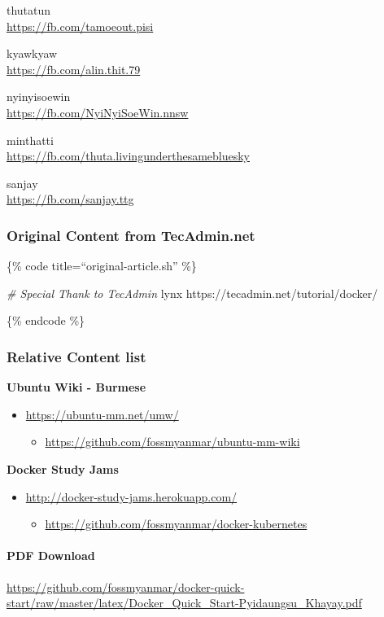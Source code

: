 \documentclass[]{article}
\newenvironment{Shaded}{}{}
\newcommand{\CommentTok}[1]{\textcolor[rgb]{0.38,0.63,0.69}{\textit{#1}}}
\newcommand{\FunctionTok}[1]{\textcolor[rgb]{0.02,0.16,0.49}{#1}}
\newcommand{\NormalTok}[1]{#1}
\providecommand{\tightlist}{%
  \setlength{\itemsep}{0pt}\setlength{\parskip}{0pt}}
\let\oldparagraph\paragraph
\renewcommand{\paragraph}[1]{\oldparagraph{#1}\mbox{}}
\begin{document}
thutatun\\
\url{https://fb.com/tamoeout.pisi}

kyawkyaw\\
\url{https://fb.com/alin.thit.79}

nyinyisoewin\\
\url{https://fb.com/NyiNyiSoeWin.nnsw}

minthatti\\
\url{https://fb.com/thuta.livingunderthesamebluesky}

sanjay\\
\url{https://fb.com/sanjay.ttg}

\hypertarget{original-content-from-tecadmin.net}{%
\subsubsection{Original Content from
TecAdmin.net}\label{original-content-from-tecadmin.net}}

\{\% code title=``original-article.sh'' \%\}

\begin{Shaded}
\begin{Highlighting}[]
\CommentTok{# Special Thank to TecAdmin}
\FunctionTok{lynx}\NormalTok{ https://tecadmin.net/tutorial/docker/}
\end{Highlighting}
\end{Shaded}

\{\% endcode \%\}

\hypertarget{relative-content-list}{%
\subsubsection{Relative Content list}\label{relative-content-list}}

\textbf{Ubuntu Wiki - Burmese}

\begin{itemize}
\tightlist
\item
  \url{https://ubuntu-mm.net/umw/}

  \begin{itemize}
  \tightlist
  \item
    \url{https://github.com/fossmyanmar/ubuntu-mm-wiki}
  \end{itemize}
\end{itemize}

\textbf{Docker Study Jams}

\begin{itemize}
\tightlist
\item
  \url{http://docker-study-jams.herokuapp.com/}

  \begin{itemize}
  \tightlist
  \item
    \url{https://github.com/fossmyanmar/docker-kubernetes}
  \end{itemize}
\end{itemize}

\hypertarget{pdf-download}{%
\paragraph{PDF Download}\label{pdf-download}}

\url{https://github.com/fossmyanmar/docker-quick-start/raw/master/latex/Docker_Quick_Start-Pyidaungsu_Khayay.pdf}

\pagebreak
\end{document}
